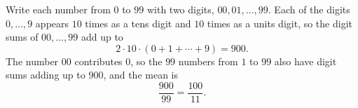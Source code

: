 Write each number from $0$ to $99$ with two digits, $00,01,\ldots,99$. Each of the digits $0,\ldots,9$ appears $10$ times as a tens digit and $10$ times as a units digit, so the digit sums of $00,\ldots,99$ add up to
\[2\cdot10\cdot(0+1+\cdots+9)=900 .\]
The number $00$ contributes $0$, so the $99$ numbers from $1$ to $99$ also have digit sums adding up to $900$, and the mean is
\[\dfrac{900}{99}=\boxed{\dfrac{100}{11}}.\]

